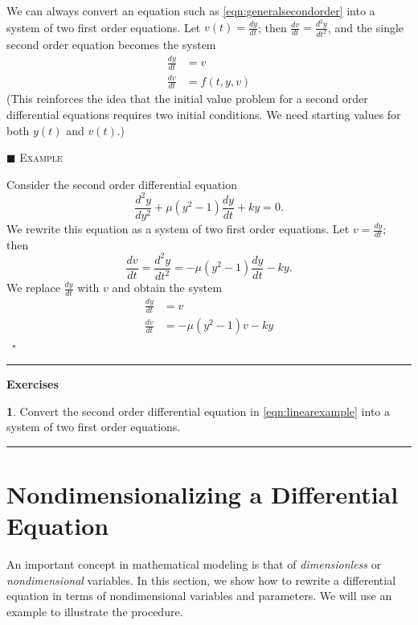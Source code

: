 \documentclass[reqno]{immbook}
\numberwithin{equation}{chapter}
\numberwithin{question}{section}
\numberwithin{theorem}{chapter}
\numberwithin{figure}{chapter}
\theoremstyle{definition}
\newtheorem{exercise}{}[section]
\newenvironment{xexample}%
{%

\medskip\noindent\addtocounter{example}{1}$\blacksquare$ \textsc{Example \theexample}\hspace*{1em}%
}%
{%
~\hfill$\square$

\medskip
}
\newenvironment{exercises}%
{%
\medskip\hrule\medskip\noindent\textbf{Exercises}%
}%
{%
\medskip\hrule
}
\begin{document}
We can always convert an equation such as
\eqref{eqn:generalsecondorder}
into a system of two first order equations.
Let $v(t) = \frac{dy}{dt}$; then
$\frac{dv}{dt} = \frac{d^2y}{dt^2}$, and the single second
order equation becomes the system
\begin{equation}
\begin{split}
   \frac{dy}{dt} & = v\\
   \frac{dv}{dt} & = f(t,y,v)
\end{split}
\end{equation}
(This reinforces the idea that the initial value problem
for a second order differential equations requires
two initial conditions.  We need starting values for
both $y(t)$ and $v(t)$.)
\begin{xexample}
Consider the second order differential equation
\begin{equation}
  \frac{d^2y}{dy^2} + \mu(y^2-1)\frac{dy}{dt} + k y = 0.
\end{equation}
We rewrite this equation as a system of two first order
equations.
Let $v = \frac{dy}{dt}$;
then
\begin{equation}
   \frac{dv}{dt} = \frac{d^2y}{dt^2} = -\mu(y^2-1)\frac{dy}{dt} - ky.
\end{equation}
We replace $\frac{dy}{dt}$ with $v$ and obtain the system
\begin{equation}
\begin{split}
   \frac{dy}{dt} & = v \\
   \frac{dv}{dt} & =  -\mu(y^2-1)v - ky
\end{split}
\end{equation}
\end{xexample}

\begin{exercises}
\begin{exercise}
Convert the second order differential equation 
in \eqref{eqn:linearexample} into a system of two first order equations.
\end{exercise}
\end{exercises}

\newpage

\section{Nondimensionalizing a Differential Equation}

An important concept in mathematical modeling
is that of \emph{dimensionless} or 
\emph{nondimensional} variables.
In this section, we show how to rewrite a differential
equation in terms of nondimensional variables and parameters.
We will use an example to illustrate the procedure.
\end{document}
